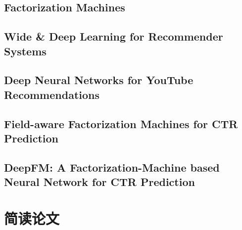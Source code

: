 \documentclass[a4paper,table]{article}
\begin{document}
\subsection{Factorization Machines}


\subsection{Wide \& Deep Learning for Recommender Systems}


\subsection{Deep Neural Networks for YouTube Recommendations}


\subsection{Field-aware Factorization Machines for CTR Prediction}


\subsection{DeepFM: A Factorization-Machine based Neural Network for CTR Prediction}


\clearpage
\section{简读论文}

% 
% 


\printbibliography


\end{document}
